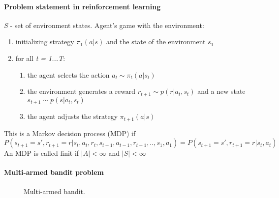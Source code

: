 \documentclass{article}
\begin{document}
\newpage

\paragraph{Problem statement in reinforcement learning}
\textit{S} - set of environment states. Agent's game with the environment:
\begin{enumerate}
	\item initializing strategy ${\pi_{1}(a|s)}$ and the state of the environment \textit{${s_{1}}$}
	\item for all \textit{t = 1...T}:
	\begin{enumerate}
		\item the agent selects the action ${a_{t}\sim\pi_{t}(a|s_{t})}$
		\item the environment generates a reward ${r_{t+1}\sim p(r|a_{t},s_{t})}$ and a new state ${s_{t+1}\sim p(s|a_{t},s_{t})}$
		\item the agent adjusts the strategy ${\pi_{t+1}(a|s)}$
	\end{enumerate}
\end{enumerate}
This is a Markov decision process (MDP) if
\begin{equation}
	P(s_{t+1} = s', r_{t+1} = r|s_{t}, a_{t}, r_{t}, s_{t-1}, a_{t-1}, r_{t-1},..,s_{1}, a_{1})=P(s_{t+1} = s', r_{t+1} = r|s_{t}, a_{t})
\end{equation}
An MDP is called finit if ${|A|<\infty}$ and ${|S|<\infty}$


\paragraph{Multi-armed bandit problem}

\begin{figure}[h!]
	\caption{Multi-armed bandit.}
\end{figure}
\end{document}
